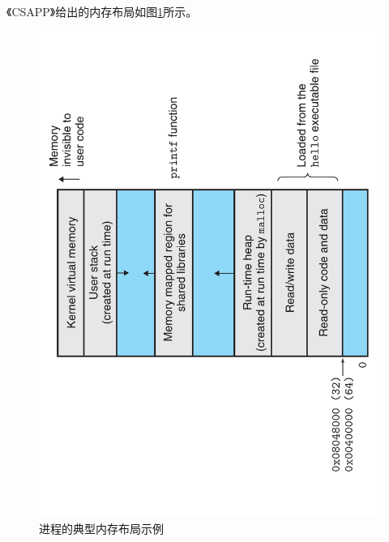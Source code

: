 《CSAPP》给出的内存布局如图\ref{fig:processmemlayout-csapp}所示。
\begin{figure}[ht]
	\begin{center}
		\includegraphics[keepaspectratio,width=0.5\paperwidth,angle=270]{Pictures/Kernel/process-mem-csapp.pdf}
	\caption{进程的典型内存布局示例}
	\label{fig:processmemlayout-csapp}
	\end{center}
\end{figure}

